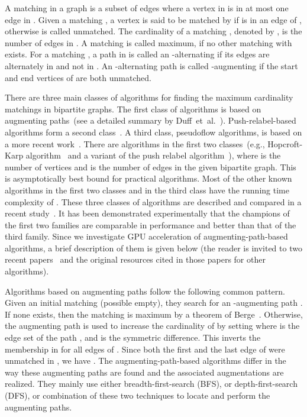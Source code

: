 \documentclass[11pt,a4paper]{article}
\begin{document}
A matching  in a graph  is a subset of edges  where a vertex in  is in at most 
one edge in . 
Given a matching , a vertex  is said to be matched by  if  is in an edge of , otherwise  is called unmatched.
The cardinality of a matching , denoted by , is the number of edges in . 
A matching  is called maximum, if no other matching  with  exists.
For a matching , a path  in  is called an -alternating if its edges are alternately in  and not in .
An -alternating path  is called -augmenting if the start and end vertices of  are both unmatched.

There are three main classes of algorithms for finding the maximum
cardinality matchings in bipartite graphs. 
The first class of algorithms is based on augmenting paths~(see a detailed summary by Duff~et~al.~\cite{duff2011design}).
Push-relabel-based algorithms form a second class~\cite{Goldberg}. 
A third class, pseudoflow algorithms, is based on a more recent work~\cite{Hochbaum_pseudo}.
There are  algorithms in the first two classes~(e.g., Hopcroft-Karp algorithm~\cite{hopcroft1973n} and a variant of the push relabel algorithm~\cite{goke:97}), where  is the number of vertices and  is the number of edges in the given bipartite graph.
This is asymptotically best bound for practical algorithms.
Most of the other known algorithms in the first two classes and in the third class have the running time complexity of  . 
These three classes of algorithms are described and compared in a recent study~\cite{klmu:12j}.
It has been demonstrated experimentally that the champions of the first two families 
are comparable in performance and better than that of the third family.
Since we investigate GPU acceleration of augmenting-path-based algorithms, a brief description of them is given below (the reader is invited to two
recent papers~\cite{duff2011design,klmu:12j} and the original resources cited in those papers for other algorithms).

Algorithms based on augmenting paths follow the following common pattern. Given an initial matching  (possible empty), they search for an -augmenting
path . If none exists, then the
matching  is maximum by a theorem of Berge~\cite{berg:57}. 
Otherwise, the augmenting path  is used to
increase the cardinality of  by setting 
where  is the edge set of the path , and  is the symmetric difference. This inverts the membership in  for all edges
of . Since both the first and the last edge of  were unmatched in , we have
.
The augmenting-path-based algorithms differ in the way these augmenting paths are found and the associated augmentations are realized.
They mainly use either breadth-first-search (BFS), or depth-first-search (DFS), or combination 
of these two techniques to locate and perform the augmenting paths. 
\end{document}
